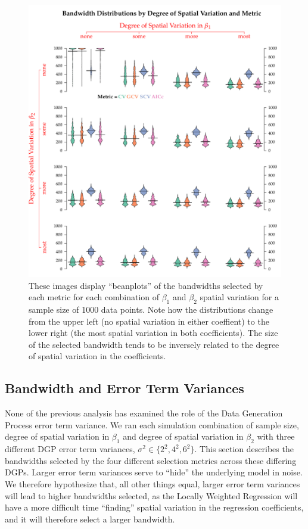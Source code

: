 \documentclass{article}\usepackage{graphicx, color}
\begin{document}
\begin{figure}
\includegraphics{figure/bandwidthsSS1000bySpatVar.pdf}
\caption{These images display ``beanplots'' of the bandwidths selected by each metric for each combination of $\beta _1$ and $\beta _2$ spatial variation for a sample size of 1000 data points. Note how the distributions change from the upper left (no spatial variation in either coeffient) to the lower right (the most spatial variation in both coefficients). The size of the selected bandwidth tends to be inversely related to the degree of spatial variation in the coefficients.}
\label{fig:bandwidthsSS1000bySpatVar}
\end{figure}

\subsection{Bandwidth and Error Term Variances}

None of the previous analysis has examined the role of the Data Generation Process error term variance. We ran each simulation combination of sample size, degree of spatial variation in $\beta _1$ and degree of spatial variation in $\beta _2$ with three different DGP error term variances, $\sigma ^2 \in \{2^2, 4^2, 6^2\}$. This section describes the bandwidths selected by the four different selection metrics across these differing DGPs. Larger error term variances serve to ``hide'' the underlying model in noise. We therefore hypothesize that, all other things equal, larger error term variances will lead to higher bandwidths selected, as the Locally Weighted Regression will have a more difficult time ``finding'' spatial variation in the regression coefficients, and it will therefore select a larger bandwidth.
\end{document}
